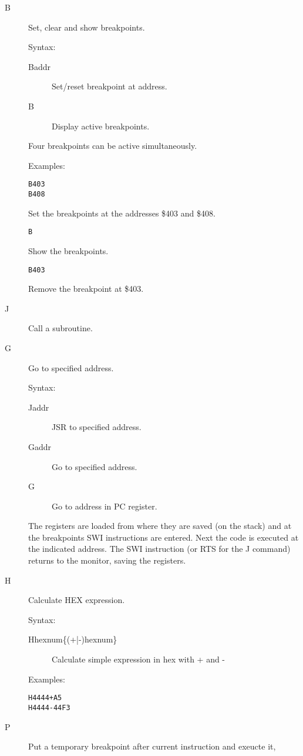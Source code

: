 \begin{description}
\item[B] Set, clear and show breakpoints.

Syntax:
\begin{description}
\item[Baddr]      Set/reset breakpoint at address.
\item[B]          Display active breakpoints.
\end{description}
Four breakpoints can be active simultaneously.

Examples:
\begin{verbatim}
B403
B408
\end{verbatim}
Set the breakpoints at the addresses \$403 and \$408.
\begin{verbatim}
B
\end{verbatim}
Show the breakpoints.
\begin{verbatim}
B403
\end{verbatim}
Remove the breakpoint at \$403.

\item[J] Call a subroutine.
\item[G] Go to specified address.

Syntax:
\begin{description}
\item[Jaddr]      JSR to specified address.
\item[Gaddr]      Go to specified address.
\item[G]          Go to address in PC register.
\end{description}
The registers are loaded from where they are saved (on the stack) and at the
breakpoints SWI instructions are entered. Next the code is executed at the
indicated address. The SWI instruction (or RTS for the J command) returns to
the monitor, saving the registers.

\item[H] Calculate HEX expression.

Syntax:

\begin{description}
\item[Hhexnum\{(+|-)hexnum\}] Calculate simple expression in hex with + and -      
\end{description}

Examples:
\begin{verbatim}
H4444+A5
H4444-44F3
\end{verbatim}

\item[P] Put a temporary breakpoint after current instruction and exeucte it,


\end{description}
